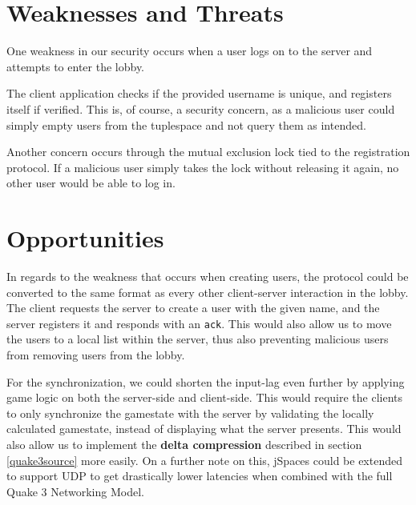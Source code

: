 \section{Weaknesses and Threats}

One weakness in our security occurs when a user logs on to the server and attempts to enter the lobby. 

The client application checks if the provided username is unique, and registers itself if verified. This is, of course, a security concern, as a malicious user could simply empty users from the tuplespace and not query them as intended. 

Another concern occurs through the mutual exclusion lock tied to the registration protocol. If a malicious user simply takes the lock without releasing it again, no other user would be able to log in.

\section{Opportunities}

In regards to the weakness that occurs when creating users, the protocol could be converted to the same format as every other client-server interaction in the lobby. The client requests the server to create a user with the given name, and the server registers it and responds with an \texttt{ack}. This would also allow us to move the users to a local list within the server, thus also preventing malicious users from removing users from the lobby. 

For the synchronization, we could shorten the input-lag even further by applying game logic on both the server-side and client-side. This would require the clients to only synchronize the gamestate with the server by validating the locally calculated gamestate, instead of displaying what the server presents. This would also allow us to implement the \textbf{delta compression} described in section \ref{quake3source} more easily. On a further note on this, jSpaces could be extended to support UDP to get drastically lower latencies when combined with the full Quake 3 Networking Model. 

